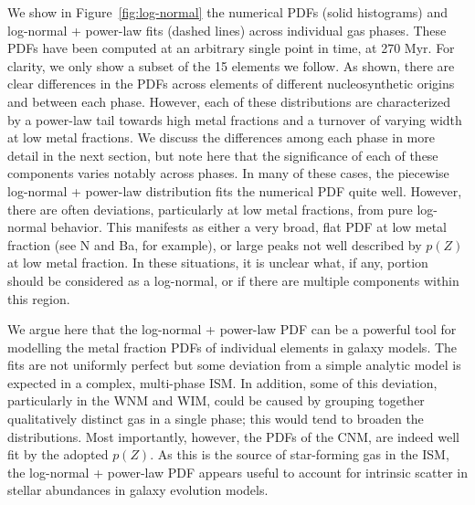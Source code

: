 \documentclass[twocolumn]{aastex61}
\begin{document}
We show in Figure~\ref{fig:log-normal} the numerical PDFs (solid histograms) and log-normal + power-law fits (dashed lines) across individual gas phases. These PDFs have been computed at an arbitrary single point in time, at 270 Myr. For clarity, we only show a subset of the 15 elements we follow. As shown, there are clear differences in the PDFs across elements of different nucleosynthetic origins and between each phase. However, each of these distributions are characterized by a power-law tail towards high metal fractions and a turnover of varying width at low metal fractions. We discuss the differences among each phase in more detail in the next section, but note here that the significance of each of these components varies notably across phases. In many of these cases, the piecewise log-normal + power-law distribution fits the numerical PDF quite well. However, there are often deviations, particularly at low metal fractions, from pure log-normal behavior. This manifests as either a very broad, flat PDF at low metal fraction (see N and Ba, for example), or large peaks not well described by $p(Z)$ at low metal fraction. In these situations, it is unclear what, if any, portion should be considered as a log-normal, or if there are multiple components within this region.

We argue here that the log-normal + power-law PDF can be a powerful tool for modelling the metal fraction  PDFs of individual elements in galaxy models. The fits are not uniformly perfect but some deviation from a simple analytic model is expected in a complex, multi-phase ISM. In addition, some of this deviation, particularly in the WNM and WIM, could be caused by grouping together qualitatively distinct gas in a single phase; this would tend to broaden the distributions. Most importantly, however, the PDFs of the CNM, are indeed well fit by the adopted $p(Z)$. As this is the source of star-forming gas in the ISM, the log-normal + power-law PDF appears useful to account for intrinsic scatter in stellar abundances in galaxy evolution models.
\end{document}
